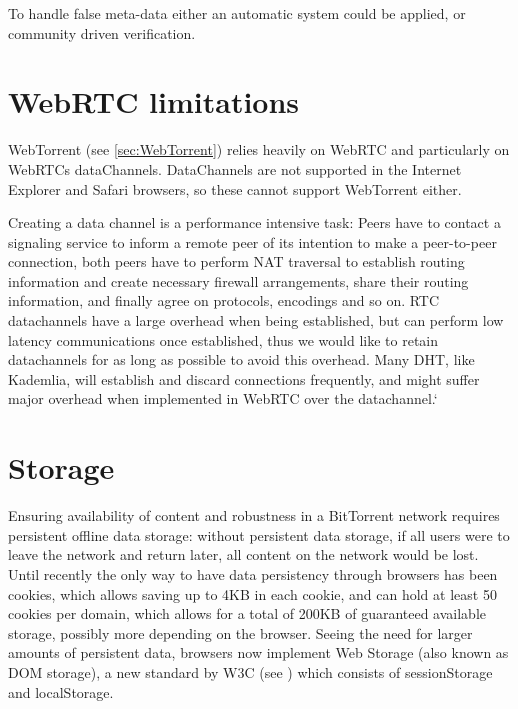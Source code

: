 To handle false meta-data either an automatic system could be applied, or
community driven verification.

\section{WebRTC limitations}
WebTorrent (see \ref{sec:WebTorrent}) relies heavily on WebRTC and particularly on WebRTCs dataChannels.
DataChannels are not supported in the Internet Explorer and Safari browsers, 
so these cannot support WebTorrent either.

Creating a data channel is a performance intensive task:
Peers have to contact a signaling service to inform a remote peer of its intention
to make a peer-to-peer connection, both peers have to perform NAT traversal to establish routing information 
and create necessary firewall arrangements, share their routing information,
and finally agree on protocols, encodings and so on.
RTC datachannels have a large overhead when being established,
but can perform low latency communications once established, 
thus we would like to retain datachannels for as long as possible to avoid this overhead.
Many \acs{DHT}, like Kademlia, will establish and discard connections frequently,
and might suffer major overhead when implemented in WebRTC over the datachannel.`

\section{Storage}
Ensuring availability of content and robustness in a BitTorrent network requires persistent offline data storage:
without persistent data storage, if all users were to leave the network and return later, all content on the 
network would be lost.
\newline\newline
Until recently the only way to have data persistency through browsers has been cookies, 
which allows saving up to 4KB in each cookie, and can hold at least 50 cookies per domain, 
which allows for a total of 200KB of guaranteed available storage, possibly more depending on the browser.
\newline\newline
Seeing the need for larger amounts of persistent data, browsers now implement Web Storage 
(also known as DOM storage), a new standard by W3C (see \citep{WebStorage})
which consists of sessionStorage and localStorage.

